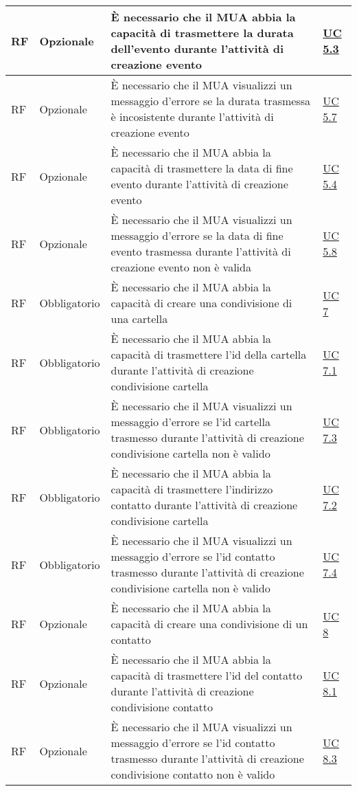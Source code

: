 \begin{longtable}{*{1}{>{\centering\arraybackslash}p{1.5cm}}*{1}{>{\centering\arraybackslash}p{2.5cm}}p{6cm}*{1}{>{\centering\arraybackslash}p{3cm}}}
    \\\hline
    RF & Opzionale & È necessario che il MUA abbia la capacità di trasmettere la durata dell'evento durante l'attività di creazione evento & \hyperref[sec:UC5.3]{UC 5.3}
    \\\hline
    RF & Opzionale & È necessario che il MUA visualizzi un messaggio d'errore se la durata trasmessa è incosistente durante l'attività di creazione evento & \hyperref[sec:UC5.7]{UC 5.7}
    \\\hline
    RF & Opzionale & È necessario che il MUA abbia la capacità di trasmettere la data di fine evento durante l'attività di creazione evento & \hyperref[sec:UC5.4]{UC 5.4}
    \\\hline
    RF & Opzionale & È necessario che il MUA visualizzi un messaggio d'errore se la data di fine evento trasmessa durante l'attività di creazione evento non è valida & \hyperref[sec:UC5.8]{UC 5.8}
    \\\hline
    RF & Obbligatorio & È necessario che il MUA abbia la capacità di creare una condivisione di una cartella & \hyperref[sec:UC7]{UC 7}
    \\\hline
    RF & Obbligatorio & È necessario che il MUA abbia la capacità di trasmettere l'id della cartella durante l'attività di creazione condivisione cartella & \hyperref[sec:UC7.1]{UC 7.1}
    \\\hline
    RF & Obbligatorio & È necessario che il MUA visualizzi un messaggio d'errore se l'id cartella trasmesso durante l'attività di creazione condivisione cartella non è valido & \hyperref[sec:UC7.3]{UC 7.3}
    \\\hline
    RF & Obbligatorio & È necessario che il MUA abbia la capacità di trasmettere l'indirizzo contatto durante l'attività di creazione condivisione cartella & \hyperref[sec:UC7.2]{UC 7.2}
    \\\hline
    RF & Obbligatorio & È necessario che il MUA visualizzi un messaggio d'errore se l'id contatto trasmesso durante l'attività di creazione condivisione cartella non è valido & \hyperref[sec:UC7.4]{UC 7.4}
    \\\hline
    RF & Opzionale & È necessario che il MUA abbia la capacità di creare una condivisione di un contatto & \hyperref[sec:UC8]{UC 8}
    \\\hline
    RF & Opzionale & È necessario che il MUA abbia la capacità di trasmettere l'id del contatto durante l'attività di creazione condivisione contatto & \hyperref[sec:UC8.1]{UC 8.1}
    \\\hline
    RF & Opzionale & È necessario che il MUA visualizzi un messaggio d'errore se l'id contatto trasmesso durante l'attività di creazione condivisione contatto non è valido & \hyperref[sec:UC8.3]{UC 8.3}

\end{longtable}
